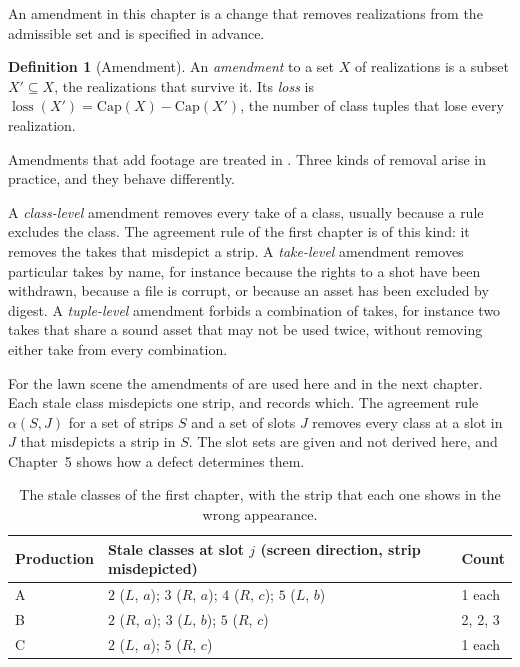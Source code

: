 \documentclass[11pt,twoside,openright]{book}
\theoremstyle{plain}
\theoremstyle{definition}
\newtheorem{definition}[theorem]{Definition}
\theoremstyle{remark}
\newcommand{\Capac}{\mathrm{Cap}}
\DeclareMathOperator{\loss}{loss}
\begin{document}
An amendment in this chapter is a change that removes realizations from the admissible set and is specified in advance.

\begin{definition}[Amendment]\label{def:amend}
An \emph{amendment} to a set $X$ of realizations is a subset $X'\subseteq X$, the realizations that survive it. Its \emph{loss} is $\loss(X')=\Capac(X)-\Capac(X')$, the number of class tuples that lose every realization.
\end{definition}

Amendments that add footage are treated in . Three kinds of removal arise in practice, and they behave differently.

A \emph{class-level} amendment removes every take of a class, usually because a rule excludes the class. The agreement rule of the first chapter is of this kind: it removes the takes that misdepict a strip. A \emph{take-level} amendment removes particular takes by name, for instance because the rights to a shot have been withdrawn, because a file is corrupt, or because an asset has been excluded by digest. A \emph{tuple-level} amendment forbids a combination of takes, for instance two takes that share a sound asset that may not be used twice, without removing either take from every combination.

For the lawn scene the amendments of  are used here and in the next chapter. Each stale class misdepicts one strip, and  records which. The agreement rule $\alpha(S,J)$ for a set of strips $S$ and a set of slots $J$ removes every class at a slot in $J$ that misdepicts a strip in $S$. The slot sets are given and not derived here, and Chapter~5 shows how a defect determines them.

\begin{table}[ht]
\centering
\begin{tabular}{@{}lll@{}}
\toprule
Production & Stale classes at slot $j$ (screen direction, strip misdepicted) & Count\\
\midrule
A & $2$ ($L$, $a$); $3$ ($R$, $a$); $4$ ($R$, $c$); $5$ ($L$, $b$) & 1 each\\
B & $2$ ($R$, $a$); $3$ ($L$, $b$); $5$ ($R$, $c$) & 2, 2, 3\\
C & $2$ ($L$, $a$); $5$ ($R$, $c$) & 1 each\\
\bottomrule
\end{tabular}
\caption{The stale classes of the first chapter, with the strip that each one shows in the wrong appearance.}\label{tab:stale}
\end{table}
\end{document}
